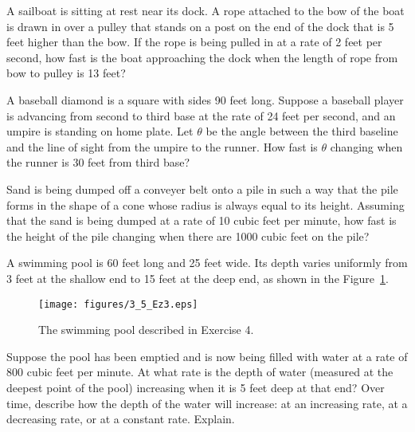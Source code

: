 \begin{exercises} 
	\item A sailboat is sitting at rest near its dock.  A rope attached to the bow of the boat is drawn in over a pulley that stands on a post on the  end of the dock that is 5 feet higher than the bow.  If the rope is being pulled in at a rate of 2 feet per second, how fast is the boat approaching the dock when the length of rope from bow to pulley is 13 feet?
	
	\item A baseball diamond is a square with sides 90 feet long.  Suppose a baseball player is advancing from second to third base at the rate of 24 feet per second, and an umpire is standing on home plate.  Let  $\theta$ be the angle between the third baseline and the line of sight from the umpire to the runner.  How fast is $\theta$ changing when the runner is 30 feet from third base?
	
	\item Sand is being dumped off a conveyer belt onto a pile in such a way that the pile forms in the shape of a cone whose radius is always equal to its height.  Assuming that the sand is being dumped at a rate of 10 cubic feet per minute, how fast is the height of the pile changing when there are 1000 cubic feet on the pile?
	
	\item A swimming pool is 60 feet long and 25 feet wide. Its depth varies uniformly from 3 feet at the shallow end to 15 feet at the deep end, as shown in the Figure~\ref{F:3.5.Ez3}.
\begin{figure}[h]
\begin{center}
\texttt{[image: figures/3\_5\_Ez3.eps]}
\caption{The swimming pool described in Exercise 4.} \label{F:3.5.Ez3}
\end{center}
\end{figure}
Suppose the pool has been emptied and is now being filled with water at a rate of 800 cubic feet per minute. At what rate is the depth of water (measured at the deepest point of the pool) increasing when it is 5 feet deep at that end?  Over time, describe how the depth of the water will increase:  at an increasing rate, at a decreasing rate, or at a constant rate.  Explain.

\end{exercises}
\afterexercises